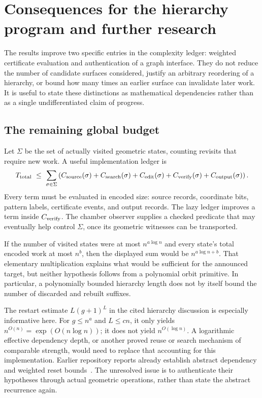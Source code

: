 \section{Consequences for the hierarchy program and further research}
\label{sec:global}

The results improve two specific entries in the complexity ledger:
weighted certificate evaluation and authentication of a graph interface.
They do not reduce the number of candidate surfaces considered, justify an
arbitrary reordering of a hierarchy, or bound how many times an earlier
surface can invalidate later work. It is useful to state these distinctions
as mathematical dependencies rather than as a single undifferentiated
claim of progress.

\subsection{The remaining global budget}

Let \(\Sigma\) be the set of actually visited geometric states, counting
revisits that require new work. A useful implementation ledger is
\[
 T_{\rm total}\ \le\
 \sum_{\sigma\in\Sigma}
 \left(C_{\rm source}(\sigma)+C_{\rm search}(\sigma)
       +C_{\rm edit}(\sigma)+C_{\rm verify}(\sigma)
       +C_{\rm output}(\sigma)\right).
\]
Every term must be evaluated in encoded size: source records, coordinate
bits, pattern labels, certificate events, and output records. The lazy
ledger improves a term inside \(C_{\rm verify}\). The chamber observer
supplies a checked predicate that may eventually help control
\(\Sigma\), once its geometric witnesses can be transported.

If the number of visited states were at most \(n^{a\log n}\) and every
state's total encoded work at most \(n^b\), then the displayed sum would
be \(n^{a\log n+b}\). That elementary multiplication explains what would
be sufficient for the announced target, but neither hypothesis follows
from a polynomial orbit primitive. In particular, a polynomially bounded
hierarchy length does not by itself bound the number of discarded and
rebuilt suffixes.

The restart estimate \(L(g+1)^L\) in the cited hierarchy discussion is
especially informative here. For \(g\le n^a\) and \(L\le cn\), it
only yields \(n^{O(n)}=\exp(O(n\log n))\); it does not yield
\(n^{O(\log n)}\). A logarithmic effective dependency depth, or another
proved reuse or search mechanism of comparable strength, would need to
replace that accounting for this implementation. Earlier repository
reports already establish abstract dependency and weighted reset
bounds~\cite{repair,persistence}. The unresolved issue is to authenticate
their hypotheses through actual geometric operations, rather than
state the abstract recurrence again.


